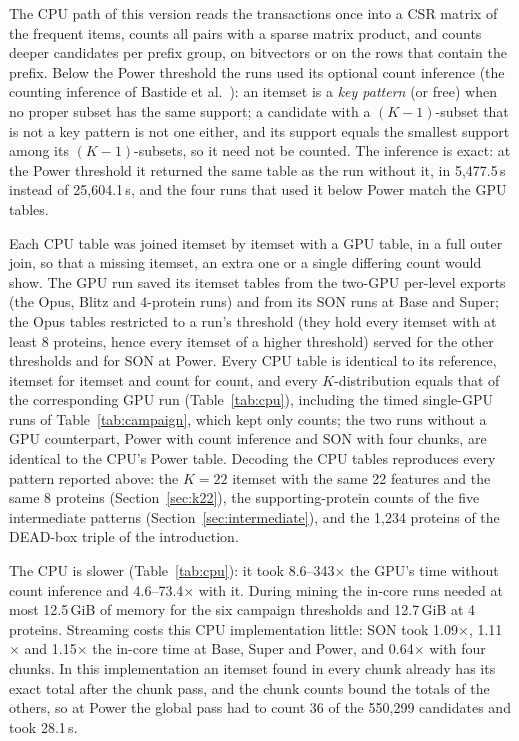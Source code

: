 \documentclass[10pt,a4paper,twocolumn]{article}
\begin{document}
The CPU path of this version reads the transactions once into a CSR matrix of the frequent items, counts all pairs with a sparse matrix product, and counts deeper candidates per prefix group, on bitvectors or on the rows that contain the prefix. Below the Power threshold the runs used its optional count inference (the counting inference of Bastide et al.~\cite{bastide2000}): an itemset is a \emph{key pattern} (or free) when no proper subset has the same support; a candidate with a $(K{-}1)$-subset that is not a key pattern is not one either, and its support equals the smallest support among its $(K{-}1)$-subsets, so it need not be counted. The inference is exact: at the Power threshold it returned the same table as the run without it, in 5,477.5\,s instead of 25,604.1\,s, and the four runs that used it below Power match the GPU tables.

Each CPU table was joined itemset by itemset with a GPU table, in a full outer join, so that a missing itemset, an extra one or a single differing count would show. The GPU run saved its itemset tables from the two-GPU per-level exports (the Opus, Blitz and 4-protein runs) and from its SON runs at Base and Super; the Opus tables restricted to a run's threshold (they hold every itemset with at least 8 proteins, hence every itemset of a higher threshold) served for the other thresholds and for SON at Power. Every CPU table is identical to its reference, itemset for itemset and count for count, and every $K$-distribution equals that of the corresponding GPU run (Table~\ref{tab:cpu}), including the timed single-GPU runs of Table~\ref{tab:campaign}, which kept only counts; the two runs without a GPU counterpart, Power with count inference and SON with four chunks, are identical to the CPU's Power table. Decoding the CPU tables reproduces every pattern reported above: the $K{=}22$ itemset with the same 22 features and the same 8 proteins (Section~\ref{sec:k22}), the supporting-protein counts of the five intermediate patterns (Section~\ref{sec:intermediate}), and the 1,234 proteins of the DEAD-box triple of the introduction.

The CPU is slower (Table~\ref{tab:cpu}): it took 8.6--343$\times$ the GPU's time without count inference and 4.6--73.4$\times$ with it. During mining the in-core runs needed at most 12.5\,GiB of memory for the six campaign thresholds and 12.7\,GiB at 4 proteins. Streaming costs this CPU implementation little: SON took 1.09$\times$, 1.11$\times$ and 1.15$\times$ the in-core time at Base, Super and Power, and 0.64$\times$ with four chunks. In this implementation an itemset found in every chunk already has its exact total after the chunk pass, and the chunk counts bound the totals of the others, so at Power the global pass had to count 36 of the 550,299 candidates and took 28.1\,s.
\end{document}
